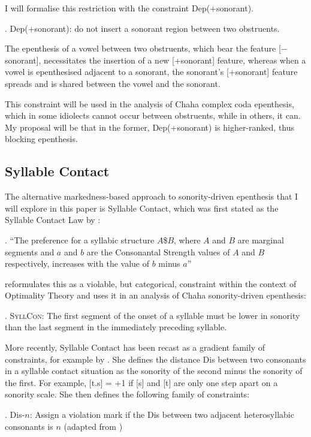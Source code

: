 \documentclass[12pt]{article}
\begin{document}
I will formalise this restriction with the constraint {\sc Dep}(+sonorant). 

\ex. {\sc Dep}(+sonorant): do not insert a sonorant region between two obstruents.

The epenthesis of a vowel between two obstruents, which bear the feature [$-$sonorant], necessitates the insertion of a new [+sonorant] feature, whereas when a vowel is epenthesised adjacent to a sonorant, the sonorant's [+sonorant] feature spreads and is shared between the vowel and the sonorant.

This constraint will be used in the analysis of Chaha complex coda epenthesis, which in some idiolects cannot occur between obstruents, while in others, it can. My proposal will be that in the former, {\sc Dep}(+sonorant) is higher-ranked, thus blocking epenthesis.

\subsection{Syllable Contact} 

The alternative markedness-based approach to sonority-driven epenthesis that I will explore in this paper is Syllable Contact, which was first stated as the Syllable Contact Law by \citet{murray.vennemann.1983}:

\ex. ``The preference for a syllabic structure $A$\$$B$, where $A$ and $B$ are marginal segments and $a$ and $b$ are the Consonantal Strength
values of $A$ and $B$ respectively, increases with the value of $b$ minus $a$'' \citep{murray.vennemann.1983}

\cite{rose.2000} reformulates this as a violable, but categorical, constraint within the context of Optimality Theory and uses it in an analysis of Chaha sonority-driven epenthesis:

\ex.  \textsc{SyllCon}: The first segment of the onset of a syllable must be lower in sonority than the last segment in the immediately preceding syllable. \citep[(5)]{rose.2000}

More recently, Syllable Contact has been recast as a gradient family of constraints, for example by \citet{gouskova.2002, gouskova.2004}.  She defines the distance {\sc Dis} between two consonants in a syllable contact situation as the sonority of the second minus the sonority of the first.  For example, [t.s] = +1 if [s] and [t] are only one step apart on a sonority scale.  She then defines the following family of constraints:

\ex. {\sc *Dis-}$n$: Assign a violation mark if the {\sc Dis} between two adjacent heterosyllabic consonants is $n$ (adapted from \citep{gouskova.2002})
\end{document}
